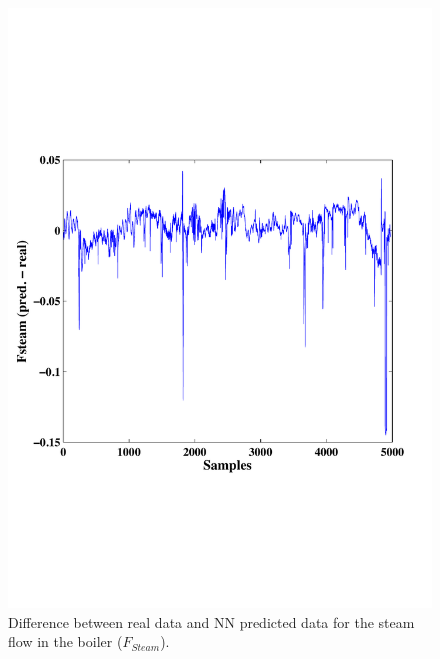 \begin{figure}
\centering
\includegraphics[width=1\textwidth]{figures/Fsteamdiff.pdf}
\caption{Difference between real data and NN predicted data for the steam flow in the boiler ($F_{Steam}$).}
\label{Fboiler}
\end{figure}


